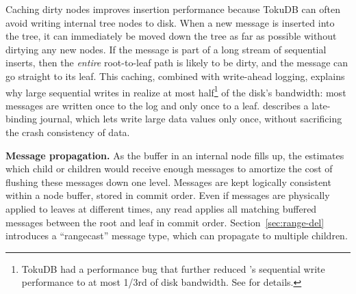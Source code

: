 Caching dirty nodes improves insertion performance
because TokuDB can often avoid writing internal tree
nodes to disk.
When a new message is inserted into the tree, it can immediately be
moved down the tree as far as possible without dirtying any new nodes.
If the message is part of a long stream of sequential inserts, then
the \emph{entire} root-to-leaf path is likely to be dirty, and the
message can go straight to its leaf.
This caching, combined with write-ahead logging,  explains why 
large sequential writes in \betrfs realize at most half\footnote{TokuDB had a performance bug that further reduced
\betrfs's sequential write performance to at most 1/3rd of disk bandwidth.  See
 for details.} of the disk's bandwidth:
most messages
are written once to the log and only once to a leaf.
 describes a late-binding journal,
which lets \sysname{} write large data values only once,
without sacrificing the crash consistency of data.



\vspace{5pt}
\noindent \textbf{Message propagation.}
As the buffer in an internal \bet node fills up, the \bet estimates which child or children
would receive enough messages to amortize the cost of flushing these
messages down one level.
Messages are kept logically consistent within a node buffer, stored in commit order.
Even if messages are physically applied to leaves at different times, any read applies all matching buffered messages between the root and leaf in commit order.
Section~\ref{sec:range-del} introduces a ``rangecast'' message type, which can
propagate to multiple children.


